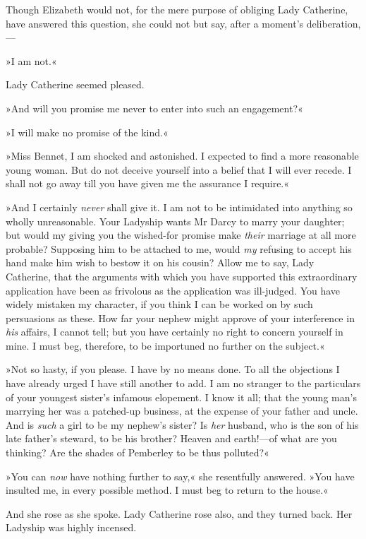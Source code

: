 Though Elizabeth would not, for the mere purpose of obliging Lady Catherine, have answered this question, she could not but say, after a moment's deliberation,—

»I am not.«

Lady Catherine seemed pleased.

»And will you promise me never to enter into such an engagement?«

»I will make no promise of the kind.«

»Miss Bennet, I am shocked and astonished. I expected to find a more reasonable young woman. But do not deceive yourself into a belief that I will ever recede. I shall not go away till you have given me the assurance I require.«

»And I certainly \textit{never} shall give it. I am not to be intimidated into anything so wholly unreasonable. Your Ladyship wants Mr Darcy to marry your daughter; but would my giving you the wished-for promise make \textit{their} marriage at all more probable? Supposing him to be attached to me, would \textit{my} refusing to accept his hand make him wish to bestow it on his cousin? Allow me to say, Lady Catherine, that the arguments with which you have supported this extraordinary application have been as frivolous as the application was ill-judged. You have widely mistaken my character, if you think I can be worked on by such persuasions as these. How far your nephew might approve of your interference in \textit{his} affairs, I cannot tell; but you have certainly no right to concern yourself in mine. I must beg, therefore, to be importuned no further on the subject.«

»Not so hasty, if you please. I have by no means done. To all the objections I have already urged I have still another to add. I am no stranger to the particulars of your youngest sister's infamous elopement. I know it all; that the young man's marrying her was a patched-up business, at the expense of your father and uncle. And is \textit{such} a girl to be my nephew's sister? Is \textit{her} husband, who is the son of his late father's steward, to be his brother? Heaven and earth!—of what are you thinking? Are the shades of Pemberley to be thus polluted?«

»You can \textit{now} have nothing further to say,« she resentfully answered. »You have insulted me, in every possible method. I must beg to return to the house.«

And she rose as she spoke. Lady Catherine rose also, and they turned back. Her Ladyship was highly incensed.

